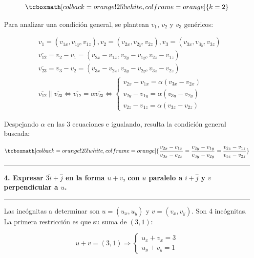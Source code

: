 \documentclass{article}
\begin{document}
\begin{enumerate}[(a)]
\begin{equation}
\tcboxmath[colback=orange!25!white,colframe=orange]
{ k = 2 }
\end{equation}

Para analizar una condición general, se plantean $v_1$, $v_2$ y $v_3$ genéricos:

\begin{subequations}
\begin{align}
& v_1 = (v_{1x}, v_{1y}, v_{1z}), v_2 = (v_{2x}, v_{2y}, v_{2z}), v_3 = (v_{3x}, v_{3y}, v_{3z}) \\
& \overline{v_{12}} = v_2 - v_1 = (v_{2x} - v_{1x}, v_{2y} - v_{1y}, v_{2z} - v_{1z}) \\
& \overline{v_{23}} = v_3 - v_2 = (v_{3x} - v_{2x}, v_{3y} - v_{2y}, v_{3z} - v_{2z}) \\
& \overline{v_{12}} \parallel \overline{v_{23}} \Leftrightarrow \overline{v_{12}} = \alpha \overline{v_{23}} \Leftrightarrow \left\{ \begin{array}{ll}
v_{2x} - v_{1x} = \alpha (v_{3x} - v_{2x}) \\
v_{2y} - v_{1y} = \alpha (v_{3y} - v_{2y}) \\
v_{2z} - v_{1z} = \alpha (v_{3z} - v_{2z})
\end{array} \right.
\end{align}
\end{subequations}

Despejando $\alpha$ en las 3 ecuaciones e igualando, resulta la condición general buscada:

\begin{equation}
\tcboxmath[colback=orange!25!white,colframe=orange]
{ \frac{v_{2x} - v_{1x}}{v_{3x} - v_{2x}} = \frac{v_{2y} - v_{1y}}{v_{3y} - v_{2y}} = \frac{v_{2z} - v_{1z}}{v_{3z} - v_{2z}} }
\end{equation}

\end{enumerate}

\hrule
\vspace{10 pt}
\textbf{4. Expresar $3 \hat{i}+\hat{j}$ en la forma $u + v$, con $u$ paralelo a $\hat{i} + \hat{j}$ y $v$ perpendicular a $u$.} 

\vspace{10 pt}
\hrule
\vspace{10 pt}

Las incógnitas a determinar son $u = (u_x, u_y)$ y $v = (v_x, v_y)$. Son 4 incógnitas. La primera restricción es que su suma de $(3, 1)$:

\begin{equation}
u + v = (3, 1) \Rightarrow \left\{ \begin{array}{ll}
u_x + v_x = 3 \\
u_y + v_y = 1
\end{array} \right.
\end{equation}
\end{document}
